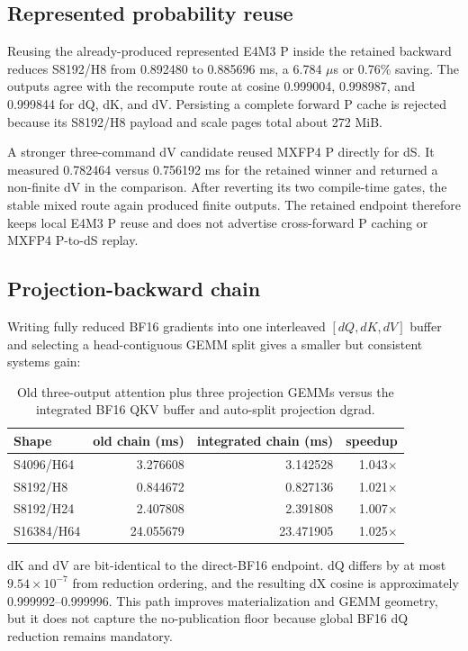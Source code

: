\subsection{Represented probability reuse}

Reusing the already-produced represented E4M3 P inside the retained backward
reduces S8192/H8 from 0.892480 to 0.885696 ms, a 6.784 $\mu$s or 0.76\%
saving.  The outputs agree with the recompute route at cosine 0.999004,
0.998987, and 0.999844 for dQ, dK, and dV.  Persisting a complete forward P
cache is rejected because its S8192/H8 payload and scale pages total about
272 MiB.

A stronger three-command dV candidate reused MXFP4 P directly for dS.  It
measured 0.782464 versus 0.756192 ms for the retained winner and returned a
non-finite dV in the comparison.  After reverting its two compile-time gates,
the stable mixed route again produced finite outputs.  The retained endpoint
therefore keeps local E4M3 P reuse and does not advertise cross-forward P
caching or MXFP4 P-to-dS replay.

\subsection{Projection-backward chain}

Writing fully reduced BF16 gradients into one interleaved
$[dQ,dK,dV]$ buffer and selecting a head-contiguous GEMM split gives a smaller
but consistent systems gain:

\begin{table}[htbp]
\centering
\caption{Old three-output attention plus three projection GEMMs versus the
integrated BF16 QKV buffer and auto-split projection dgrad.}
\label{tab:projection-backward-chain}
\small
\begin{tabular}{l rrr}
\toprule
Shape & old chain (ms) & integrated chain (ms) & speedup \\
\midrule
S4096/H64  & 3.276608  & 3.142528  & 1.043$\times$ \\
S8192/H8   & 0.844672  & 0.827136  & 1.021$\times$ \\
S8192/H24  & 2.407808  & 2.391808  & 1.007$\times$ \\
S16384/H64 & 24.055679 & 23.471905 & 1.025$\times$ \\
\bottomrule
\end{tabular}
\end{table}

dK and dV are bit-identical to the direct-BF16 endpoint.  dQ differs by at
most $9.54\times10^{-7}$ from reduction ordering, and the resulting dX cosine
is approximately 0.999992--0.999996.  This path improves materialization and
GEMM geometry, but it does not capture the no-publication floor because global
BF16 dQ reduction remains mandatory.


